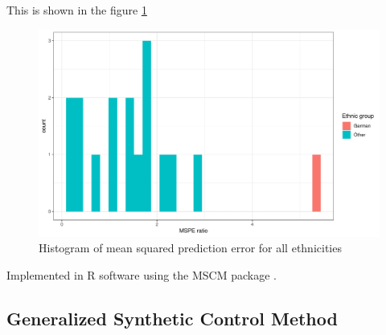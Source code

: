 This is shown in  the figure \ref{fig_sc_mspe_hist}
\begin{figure}[h]
\centering
\includegraphics[width=\textwidth]{plots/synthetic_control/mspe_histogram.pdf}
\caption{Histogram of mean squared prediction error for all ethnicities}
\label{fig_sc_mspe_hist}
\end{figure}

Implemented in R software using the MSCM package \citep{becker_fast_2018}.
\subsection{Generalized Synthetic Control Method}
\citet{xu_generalized_2017}
